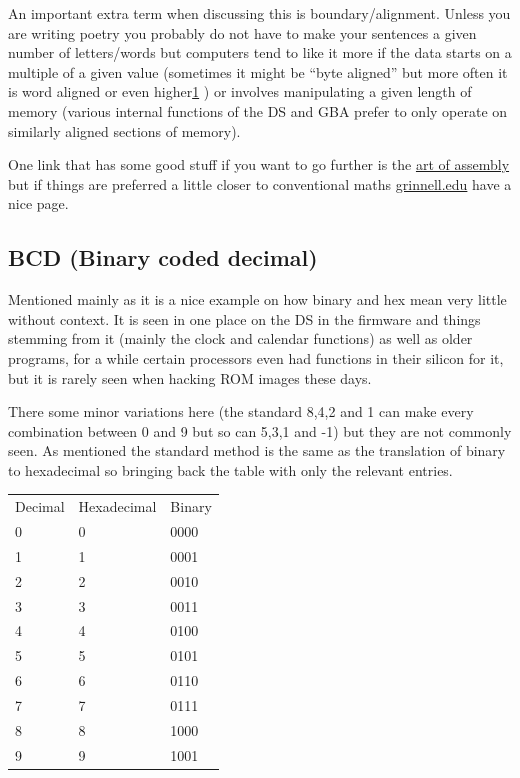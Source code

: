 \documentclass[
]{book}
\begin{document}
An important extra term when discussing this is boundary/alignment. Unless you are writing poetry you probably do not have to make your sentences a given number of letters/words but computers tend to like it more if the data starts on a multiple of a given value (sometimes it might be ``byte aligned'' but more often it is word aligned or even higher\href{romhacking20202.html\#fn1x0}{1} ) or involves manipulating a given length of memory (various internal functions of the DS and GBA prefer to only operate on similarly aligned sections of memory).

One link that has some good stuff if you want to go further is the \href{http://www.plantation-productions.com/Webster/www.artofasm.com/Windows/HTML/DataRepresentation.html\#998834}{art of assembly} but if things are preferred a little closer to conventional maths \href{http://www.cs.grinnell.edu/~rebelsky/Courses/CS152/97F/Readings/student-binary.html}{grinnell.edu} have a nice page.

\hypertarget{bcd-binary-coded-decimal}{%
\subsection{BCD (Binary coded decimal)}\label{bcd-binary-coded-decimal}}

Mentioned mainly as it is a nice example on how binary and hex mean very little without context. It is seen in one place on the DS in the firmware and things stemming from it (mainly the clock and calendar functions) as well as older programs, for a while certain processors even had functions in their silicon for it, but it is rarely seen when hacking ROM images these days.

There some minor variations here (the standard 8,4,2 and 1 can make every combination between 0 and 9 but so can 5,3,1 and -1) but they are not commonly seen. As mentioned the standard method is the same as the translation of binary to hexadecimal so bringing back the table with only the relevant entries.

\begin{longtable}[]{@{}lll@{}}
\toprule()
\endhead
Decimal & Hexadecimal & Binary \\
0 & 0 & 0000 \\
1 & 1 & 0001 \\
2 & 2 & 0010 \\
3 & 3 & 0011 \\
4 & 4 & 0100 \\
5 & 5 & 0101 \\
6 & 6 & 0110 \\
7 & 7 & 0111 \\
8 & 8 & 1000 \\
9 & 9 & 1001 \\
\bottomrule()
\end{longtable}
\end{document}
